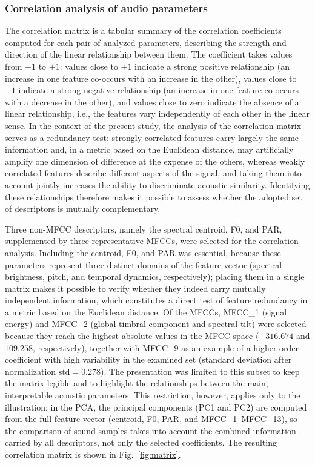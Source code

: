 \documentclass[doubleblind,preprint,12pt]{elsarticle}
\begin{document}
\subsubsection{Correlation analysis of audio parameters}
The correlation matrix is a tabular summary of the correlation coefficients computed for each pair of analyzed parameters, describing the strength and direction of the linear relationship between them. The coefficient takes values from $-1$ to $+1$: values close to $+1$ indicate a strong positive relationship (an increase in one feature co-occurs with an increase in the other), values close to $-1$ indicate a strong negative relationship (an increase in one feature co-occurs with a decrease in the other), and values close to zero indicate the absence of a linear relationship, i.e., the features vary independently of each other in the linear sense. In the context of the present study, the analysis of the correlation matrix serves as a redundancy test: strongly correlated features carry largely the same information and, in a metric based on the Euclidean distance, may artificially amplify one dimension of difference at the expense of the others, whereas weakly correlated features describe different aspects of the signal, and taking them into account jointly increases the ability to discriminate acoustic similarity. Identifying these relationships therefore makes it possible to assess whether the adopted set of descriptors is mutually complementary.


Three non-MFCC descriptors, namely the spectral centroid, F0, and PAR, supplemented by three representative MFCCs, were selected for the correlation analysis. Including the centroid, F0, and PAR was essential, because these parameters represent three distinct domains of the feature vector (spectral brightness, pitch, and temporal dynamics, respectively); placing them in a single matrix makes it possible to verify whether they indeed carry mutually independent information, which constitutes a direct test of feature redundancy in a metric based on the Euclidean distance. Of the MFCCs, MFCC\_1 (signal energy) and MFCC\_2 (global timbral component and spectral tilt) were selected because they reach the highest absolute values in the MFCC space ($-316.674$ and $109.258$, respectively), together with MFCC\_9 as an example of a higher-order coefficient with high variability in the examined set (standard deviation after normalization $\text{std} = 0.278$). The presentation was limited to this subset to keep the matrix legible and to highlight the relationships between the main, interpretable acoustic parameters. This restriction, however, applies only to the illustration: in the PCA, the principal components (PC1 and PC2) are computed from the full feature vector (centroid, F0, PAR, and MFCC\_1--MFCC\_13), so the comparison of sound samples takes into account the combined information carried by all descriptors, not only the selected coefficients. The resulting correlation matrix is shown in Fig.~\ref{fig:matrix}.
\end{document}
